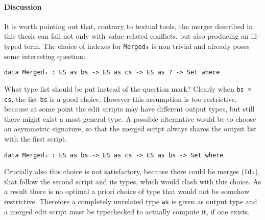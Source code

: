 \documentclass[../Thesis.tex]{subfiles}
\begin{document}
	\paragraph{Discussion}
	It is worth pointing out that, contrary to textual tools, 
	the merger described in this thesis can fail 
	not only with value related conflicts, but also producing
	an ill-typed term.
	The choice of indexes for \texttt{Merged₃} is non trivial
	and already poses some interesting question:

\begin{verbatim}
data Merged₃ : ES as bs -> ES as cs -> ES as ? -> Set where
\end{verbatim}	
	What type list should be put instead of the question mark?
	Clearly when \texttt{bs ≡ cs}, the list \texttt{bs} is a good choice.
	However this assumption is too restrictive, because at some
	point the edit scripts may have different output types, but still there might 
	exist a most general type.
	A possible alternative would be to choose an asymmetric signature,
	so that the merged script always shares the output list with the first script.
\begin{verbatim}
data Merged₃ : ES as bs -> ES as cs -> ES as bs -> Set where
\end{verbatim}	
	Crucially also this choice is not satisfactory, because 
	there could be merges (\texttt{Id₁}), that follow the second script and its 
	types, which would clash with this choice.
	As a result there is no optimal a priori choice of type that would not
	be somehow restrictive. Therefore a completely
	unrelated type \texttt{ws} is given as output type and 
	a merged edit script must be typechecked to actually compute it, if one 
	exists.
				
\end{document}
